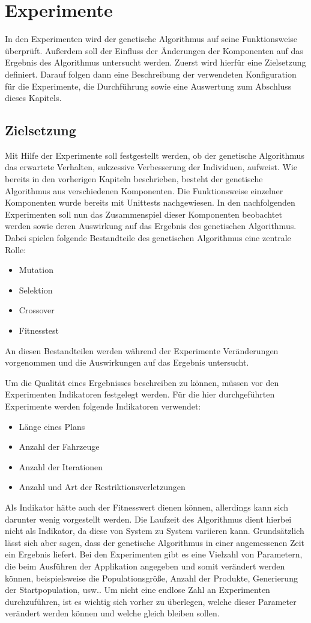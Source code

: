 \section{Experimente}
In den Experimenten wird der genetische Algorithmus auf seine Funktionsweise überprüft. Außerdem soll der Einfluss der Änderungen der Komponenten auf das Ergebnis des Algorithmus untersucht werden. Zuerst wird hierfür eine Zielsetzung definiert. Darauf folgen dann eine Beschreibung der verwendeten Konfiguration für die Experimente, die Durchführung sowie eine Auswertung zum Abschluss dieses Kapitels.

\subsection{Zielsetzung}
\label{sec:Zielsetzung}
Mit Hilfe der Experimente soll festgestellt werden, ob der genetische Algorithmus das erwartete Verhalten, sukzessive Verbesserung der Individuen, aufweist. Wie bereits in den vorherigen Kapiteln beschrieben, besteht der genetische Algorithmus aus verschiedenen Komponenten. Die Funktionsweise einzelner Komponenten wurde bereits mit Unittests nachgewiesen. In den nachfolgenden Experimenten soll nun das Zusammenspiel dieser Komponenten beobachtet werden sowie deren Auswirkung auf das Ergebnis des genetischen Algorithmus. Dabei spielen folgende Bestandteile des genetischen Algorithmus eine zentrale Rolle:
\begin{itemize}
 \item Mutation
 \item Selektion
 \item Crossover
 \item Fitnesstest
\end{itemize}
An diesen Bestandteilen werden während der Experimente Veränderungen vorgenommen und die Auswirkungen auf das Ergebnis untersucht.

Um die Qualität eines Ergebnisses beschreiben zu können, müssen vor den Experimenten Indikatoren festgelegt werden. Für die hier durchgeführten Experimente werden folgende Indikatoren verwendet:
\begin{itemize}
 \item Länge eines Plans
 \item Anzahl der Fahrzeuge
 \item Anzahl der Iterationen
 \item Anzahl und Art der Restriktionsverletzungen
\end{itemize}
Als Indikator hätte auch der Fitnesswert dienen können, allerdings kann sich darunter wenig vorgestellt werden. Die Laufzeit des Algorithmus dient hierbei nicht als Indikator, da diese von System zu System variieren kann. Grundsätzlich lässt sich aber sagen, dass der genetische Algorithmus in einer angemessenen Zeit ein Ergebnis liefert.
Bei den Experimenten gibt es eine Vielzahl von Parametern, die beim Ausführen der Applikation angegeben und somit verändert werden können, beispielsweise die Populationsgröße, Anzahl der Produkte, Generierung der Startpopulation, usw.. Um nicht eine endlose Zahl an Experimenten durchzuführen, ist es wichtig sich vorher zu überlegen, welche dieser Parameter verändert werden können und welche gleich bleiben sollen.


